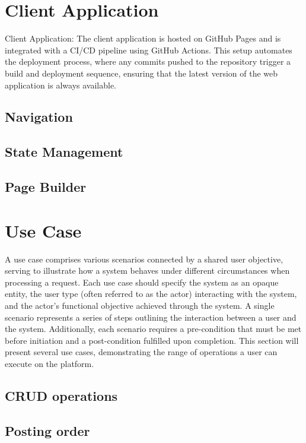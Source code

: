 \section{Client Application}
Client Application: The client application is hosted on GitHub Pages and is integrated with a CI/CD
pipeline using GitHub Actions. This setup automates the deployment process, where any commits pushed
to the repository trigger a build and deployment sequence, ensuring that the latest version of the
web application is always available.

\subsection{Navigation}
\subsection{State Management}
\subsection{Page Builder}


\section{Use Case}
A use case comprises various scenarios connected by a shared user objective, serving to illustrate
how a system behaves under different circumstances when processing a request. Each use case should
specify the system as an opaque entity, the user type (often referred to as the actor) interacting
with the system, and the actor's functional objective achieved through the system. A single scenario
represents a series of steps outlining the interaction between a user and the system. Additionally,
each scenario requires a pre-condition that must be met before initiation and a post-condition
fulfilled upon completion. This section will present several use cases, demonstrating the range of
operations a user can execute on the platform.

\subsection{CRUD operations}
\subsection{Posting order}

